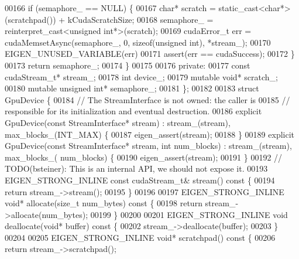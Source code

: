 \begin{DoxyCode}
00166     \textcolor{keywordflow}{if} (semaphore\_ == NULL) \{
00167       \textcolor{keywordtype}{char}* scratch = \textcolor{keyword}{static\_cast<}\textcolor{keywordtype}{char}*\textcolor{keyword}{>}(scratchpad()) + kCudaScratchSize;
00168       semaphore\_ = \textcolor{keyword}{reinterpret\_cast<}\textcolor{keywordtype}{unsigned} \textcolor{keywordtype}{int}*\textcolor{keyword}{>}(scratch);
00169       cudaError\_t err = cudaMemsetAsync(semaphore\_, 0, \textcolor{keyword}{sizeof}(\textcolor{keywordtype}{unsigned} \textcolor{keywordtype}{int}), *stream\_);
00170       EIGEN\_UNUSED\_VARIABLE(err)
00171       assert(err == cudaSuccess);
00172     \}
00173     \textcolor{keywordflow}{return} semaphore\_;
00174   \}
00175 
00176  \textcolor{keyword}{private}:
00177   \textcolor{keyword}{const} cudaStream\_t* stream\_;
00178   \textcolor{keywordtype}{int} device\_;
00179   \textcolor{keyword}{mutable} \textcolor{keywordtype}{void}* scratch\_;
00180   \textcolor{keyword}{mutable} \textcolor{keywordtype}{unsigned} \textcolor{keywordtype}{int}* semaphore\_;
00181 \};
00182 
00183 \textcolor{keyword}{struct }GpuDevice \{
00184   \textcolor{comment}{// The StreamInterface is not owned: the caller is}
00185   \textcolor{comment}{// responsible for its initialization and eventual destruction.}
00186   \textcolor{keyword}{explicit} GpuDevice(\textcolor{keyword}{const} StreamInterface* stream) : stream\_(stream), max\_blocks\_(INT\_MAX) \{
00187     eigen\_assert(stream);
00188   \}
00189   \textcolor{keyword}{explicit} GpuDevice(\textcolor{keyword}{const} StreamInterface* stream, \textcolor{keywordtype}{int} num\_blocks) : stream\_(stream), max\_blocks\_(
      num\_blocks) \{
00190     eigen\_assert(stream);
00191   \}
00192   \textcolor{comment}{// TODO(bsteiner): This is an internal API, we should not expose it.}
00193   EIGEN\_STRONG\_INLINE \textcolor{keyword}{const} cudaStream\_t& stream()\textcolor{keyword}{ const }\{
00194     \textcolor{keywordflow}{return} stream\_->stream();
00195   \}
00196 
00197   EIGEN\_STRONG\_INLINE \textcolor{keywordtype}{void}* allocate(\textcolor{keywordtype}{size\_t} num\_bytes)\textcolor{keyword}{ const }\{
00198     \textcolor{keywordflow}{return} stream\_->allocate(num\_bytes);
00199   \}
00200 
00201   EIGEN\_STRONG\_INLINE \textcolor{keywordtype}{void} deallocate(\textcolor{keywordtype}{void}* buffer)\textcolor{keyword}{ const }\{
00202     stream\_->deallocate(buffer);
00203   \}
00204 
00205   EIGEN\_STRONG\_INLINE \textcolor{keywordtype}{void}* scratchpad()\textcolor{keyword}{ const }\{
00206     \textcolor{keywordflow}{return} stream\_->scratchpad();

\end{DoxyCode}
